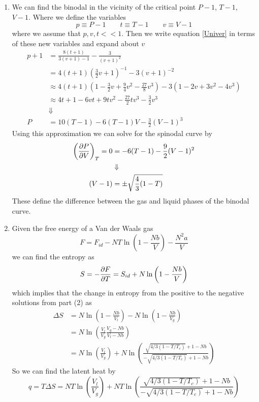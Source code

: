 \documentclass[11pt]{article}
\numberwithin{equation}{section}
\begin{document}
\begin{enumerate}[(1)]
\item We can find the binodal in the vicinity of the critical point $P-1$, $T-1$, $V-1$. 
Where we define the variables
$$p\equiv{P-1}\qquad t\equiv{T-1}\qquad v\equiv{V-1}$$
where we assume that $p,v,t<<1$. Then we write equation \ref{Univer} in terms of these new
variables and expand about $v$
\begin{align*}
p+1 &= \frac{8(t+1)}{3(v+1)-1}-\frac{3}{(v+1)^2}\\
&= 4(t+1)\left(\frac{3}{2}v+1\right)^{-1} - 3(v+1)^{-2}\\
&\approx 4(t+1)\left(1-\frac{3}{2}v+\frac{9}{4}v^2-\frac{27}{8}v^3\right) - 3\left(1-2v+3v^2-4v^3\right)\\
&\approx 4t + 1 - 6vt + 9tv^2 - \frac{27}{2}tv^3 - \frac{3}{2}v^3\\
&\Downarrow\\
P &= 10(T-1) - 6(T-1)V - \frac{3}{2}(V-1)^3
\end{align*}
Using this approximation we can solve for the spinodal curve by
\begin{align*}
\left(\frac{\partial{P}}{\partial{V}}\right)_{T} = 0 &= -6(T-1) -\frac{9}{2}(V-1)^2\\
&\Downarrow\\
(V-1) &= \pm\sqrt{\frac{4}{3}(1-T)}
\end{align*}
These define the difference between the gas and liquid phases of the binodal curve.

\item Given the free energy of a Van der Waals gas
\begin{equation}
F = F_{id} - NT\ln\left(1-\frac{Nb}{V}\right)-\frac{N^2a}{V}
\label{FreeEn}
\end{equation}
we can find the entropy as
$$S = -\frac{\partial{F}}{\partial{T}} =S_{id} + N\ln\left(1-\frac{Nb}{V}\right)$$
which implies that the change in entropy from the positive to the negative solutions from 
part (2) as
\begin{align*}
\Delta{S} &= N\ln\left(1-\frac{Nb}{V_l}\right) - N\ln\left(1-\frac{Nb}{V_g}\right)\\
&= N\ln\left(\frac{V_l}{V_g}\frac{V_g-Nb}{V_l-Nb}\right)\\
&= N\ln\left(\frac{V_l}{V_g}\right)+N\ln\left(\frac{\sqrt{4/3(1-T/T_c)}+1-Nb}{-\sqrt{4/3(1-T/T_c)}+1-Nb}\right)
\end{align*}
So we can find the latent heat by
$$q = T\Delta{S} = NT\ln\left(\frac{V_l}{V_g}\right)+NT\ln\left(\frac{\sqrt{4/3(1-T/T_c)}+1-Nb}{-\sqrt{4/3(1-T/T_c)}+1-Nb}\right)$$
\end{enumerate}
\end{document}
